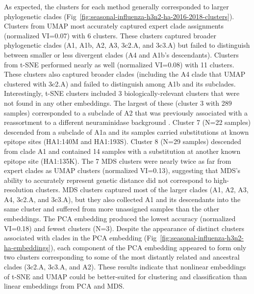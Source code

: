 \documentclass[10pt,letterpaper]{article}
\begin{document}
As expected, the clusters for each method generally corresponded to larger phylogenetic clades (Fig~\ref{fig:seasonal-influenza-h3n2-ha-2016-2018-clusters}).
Clusters from UMAP most accurately captured expert clade assignments (normalized VI=0.07) with 6 clusters.
These clusters captured broader phylogenetic clades (A1, A1b, A2, A3, 3c2.A, and 3c3.A) but failed to distinguish between smaller or less divergent clades (A4 and A1b's descendants).
Clusters from t-SNE performed nearly as well (normalized VI=0.08) with 11 clusters.
These clusters also captured broader clades (including the A4 clade that UMAP clustered with 3c2.A) and failed to distinguish among A1b and its subclades.
Interestingly, t-SNE clusters included 3 biologically-relevant clusters that were not found in any other embeddings.
The largest of these (cluster 3 with 289 samples) corresponded to a subclade of A2 that was previously associated with a reassortment to a different neuraminidase background \cite{Potter2019}.
Cluster 7 (N=22 samples) descended from a subclade of A1a and its samples carried substitutions at known epitope sites (HA1:140M and HA1:193S).
Cluster 8 (N=29 samples) descended from clade A1 and contained 14 samples with a substitution at another known epitope site (HA1:135K).
The 7 MDS clusters were nearly twice as far from expert clades as UMAP clusters (normalized VI=0.13), suggesting that MDS's ability to accurately represent genetic distance did not correspond to high-resolution clusters.
MDS clusters captured most of the larger clades (A1, A2, A3, A4, 3c2.A, and 3c3.A), but they also collected A1 and its descendants into the same cluster and suffered from more unassigned samples than the other embeddings.
The PCA embedding produced the lowest accuracy (normalized VI=0.18) and fewest clusters (N=3).
Despite the appearance of distinct clusters associated with clades in the PCA embedding (Fig~\ref{fig:seasonal-influenza-h3n2-ha-embeddings}), each component of the PCA embedding appeared to form only two clusters corresponding to some of the most distantly related and ancestral clades (3c2.A, 3c3.A, and A2).
These results indicate that nonlinear embeddings of t-SNE and UMAP could be better-suited for clustering and classification than linear embeddings from PCA and MDS.
\end{document}
